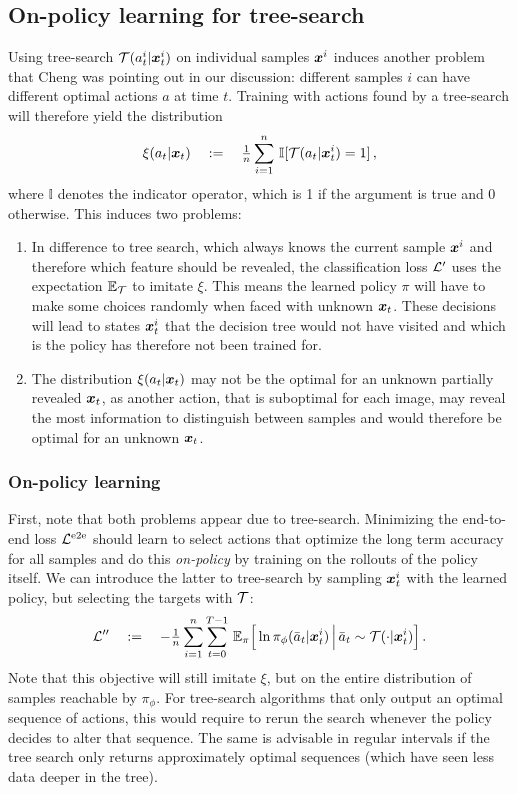 \subsection{On-policy learning for tree-search}
Using tree-search $\mathcal{T}(a^i_t|\bm x^i_t)$ 
on individual samples $\bm x^i$
induces another problem that 
Cheng was pointing out in our discussion: 
different samples $i$ can have different optimal actions $a$ at time $t$.
Training with actions found by a tree-search 
will therefore yield the distribution 
\begin{align}
	\xi(a_t|\bm x_t) 
	\quad:=\quad {\textstyle \frac{1}{n}}\sum_{i=1}^n \,
	\mathbb{I}[\mathcal{T}(a_t| \bm x^i_t) = 1] \,,
\end{align}
where $\mathbb{I}$ denotes the indicator operator, 
which is 1 if the argument is true and 0 otherwise. 
This induces two problems:
\begin{enumerate}
	\item In difference to tree search, 
		which always knows the current sample $\bm x^i$
		and therefore which feature should be revealed, 
		the classification loss $\mathcal{L}'$
		uses the expectation $\mathbb{E}_{\mathcal{T}}$ to imitate $\xi$.
		This means the learned policy $\pi$ 
		will have to make some choices randomly when 
		faced with unknown $\bm x_t$.
		These decisions will lead to states $\bm x^i_t$
		that the decision tree would not have visited
		and which is the policy has therefore not been trained for. 
	\item The distribution $\xi(a_t|\bm x_t)$ may not be the optimal
		for an unknown partially revealed $\bm x_t$,
		as another action, that is suboptimal for each image,
		may reveal the most information to distinguish between 
		samples and would therefore be optimal for an unknown $\bm x_t$.
\end{enumerate}

\subsubsection{On-policy learning}
First, note that both problems appear due to tree-search.
Minimizing the end-to-end loss $\mathcal{L}^\text{e2e}$
should learn to select actions that optimize the long term
accuracy for all samples and do this {\em on-policy}
by training on the rollouts of the policy itself.
We can introduce the latter to tree-search
by sampling $\bm x_t^i$ with the learned policy, 
but selecting the targets with $\mathcal{T}$:
\begin{align}
	\mathcal{L}'' \quad:=\quad
	-{\textstyle \frac{1}{n}} \sum_{i=1}^{n} \sum_{t=0}^{T-1}\,  
	\mathbb{E}_{\pi}\Big[ \ln \pi_\phi(\bar a_t| \bm x^i_t) 
		\,\Big|\, \bar a_t \sim \mathcal{T}(\cdot|\bm x_t^i) \Big] \,.
\end{align}
Note that this objective will still imitate $\xi$,
but on the entire distribution of samples reachable by $\pi_\phi$.
For tree-search algorithms that only output 
an optimal sequence of actions, 
this would require to rerun the search whenever 
the policy decides to alter that sequence.
The same is advisable in regular intervals
if the tree search only returns approximately optimal sequences
(which have seen less data deeper in the tree).

